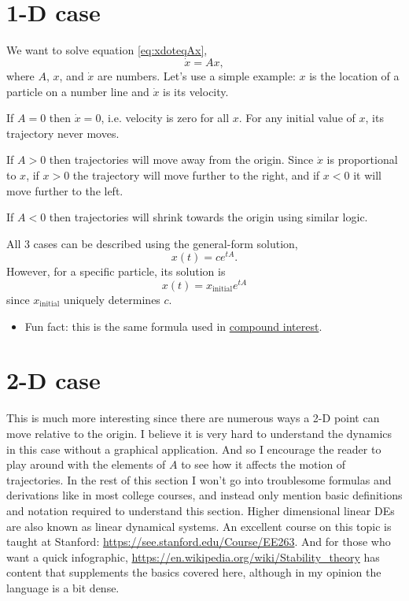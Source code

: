 \documentclass[11pt, oneside]{article}   	%
\begin{document}
\section{1-D case}

We want to solve equation \ref{eq:xdoteqAx},
$$\dot{x} = Ax,$$
where $A$, $x$, and $\dot{x}$ are numbers.
Let's use a simple example: $x$ is the location of a particle on a number line and $\dot{x}$ is its velocity.

If $A = 0$ then $\dot{x} = 0$, i.e. velocity is zero for all $x$.
For any initial value of $x$, its trajectory never moves.

If $A > 0$ then trajectories will move away from the origin.
Since $\dot{x}$ is proportional to $x$,
if $x > 0$ the trajectory will move further to the right, and if $x < 0$ it will move further to the left.

If $A < 0$ then trajectories will shrink towards the origin using similar logic.

All 3 cases can be described using the general-form solution,
\begin{equation}
x(t) = ce^{tA} .
\end{equation}
However, for a specific particle, its solution is
\begin{equation} \label{eq:1Dsol}
x(t) = x_\mathrm{initial} e^{tA}
\end{equation}
since $x_\mathrm{initial}$ uniquely determines $c$.
\begin{itemize}
  \item Fun fact: this is the same formula used in
  \href{https://en.wikipedia.org/wiki/Compound_interest#Continuous_compounding}{compound interest}.
\end{itemize}

\section{2-D case}

This is much more interesting since there are numerous ways a 2-D point can move relative to the origin.
I believe it is very hard to understand the dynamics in this case without a graphical application.
And so I encourage the reader to play around with the elements of $A$ to see how it affects the motion of trajectories.
In the rest of this section I won't go into troublesome formulas and derivations like in most college courses,
and instead only mention basic definitions and notation required to understand this section.
Higher dimensional linear DEs are also known as linear dynamical systems.
An excellent course on this topic is taught at Stanford: \url{https://see.stanford.edu/Course/EE263}.
And for those who want a quick infographic,
\url{https://en.wikipedia.org/wiki/Stability_theory} has content that supplements the basics covered here,
although in my opinion the language is a bit dense.
\end{document}
